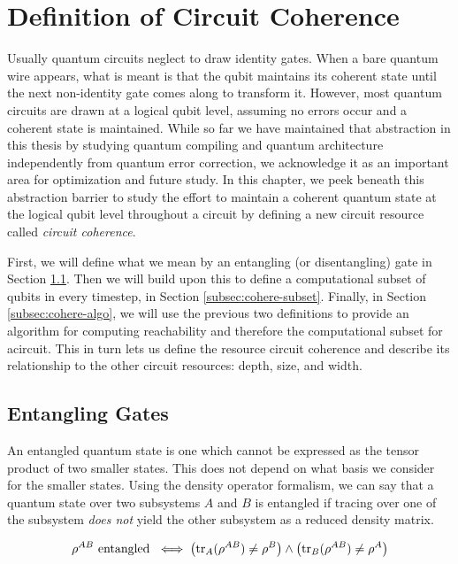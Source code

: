 \section{Definition of Circuit Coherence}
\label{sec:cohere-def}

Usually quantum circuits neglect to draw identity gates. When a bare
quantum wire appears, what is meant is that the qubit maintains its
coherent state until the next non-identity gate comes along to transform it.
However, most quantum circuits are drawn at a logical qubit level,
assuming no errors occur and a coherent state is maintained. While
so far we have maintained that abstraction in this thesis by studying
quantum compiling and quantum architecture independently from
quantum error correction, we acknowledge it as an important area for
optimization and future study. In this chapter, we peek beneath
this abstraction barrier to study
the effort to maintain a coherent quantum state at the logical qubit level
throughout a circuit
by defining a new circuit resource called \emph{circuit coherence}.

First, we will define what we mean by an entangling (or disentangling) gate
in Section \ref{subsec:cohere-entangle}. Then we will build upon this
to define a computational subset of qubits in every
timestep, in Section \ref{subsec:cohere-subset}. Finally,
in Section \ref{subsec:cohere-algo}, we will use
the previous two definitions to provide an algorithm for
computing reachability and therefore the computational subset for acircuit.
This in turn lets us define the resource circuit coherence and
describe its relationship to the other circuit resources: depth, size, and
width. 

\subsection{Entangling Gates}
\label{subsec:cohere-entangle}

An entangled quantum state is one which cannot be expressed as the
tensor product of two smaller states. This does not depend on what basis
we consider for the smaller states. Using the density operator formalism,
we can say that a quantum state over two subsystems $A$ and $B$ is
entangled if tracing over one of the subsystem \emph{does not} yield the other subsystem
as a reduced density matrix.

\begin{equation}
\rho^{AB} \text{ entangled }
\iff \left( \text{tr}_{A}(\rho^{AB}) \ne \rho^{B} \right) \land
\left(\text{tr}_{B}(\rho^{AB}) \ne \rho^{A} \right)
\end{equation}

